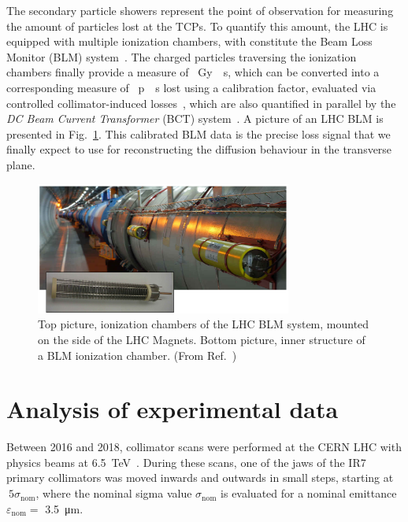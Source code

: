 The secondary particle showers represent the point of observation for measuring the amount of particles lost at the TCPs. To quantify this amount, the LHC is equipped with multiple ionization chambers, with constitute the Beam Loss Monitor (BLM) system~\cite{blmSystem1, blmSystem2}. The charged particles traversing the ionization chambers finally provide a measure of \SI{}{Gy \per s}, which can be converted into a corresponding measure of \SI{}{p \per s} lost using a calibration factor, evaluated via controlled collimator-induced losses~\cite{arek}, which are also quantified in parallel by the \textit{DC Beam Current Transformer} (BCT) system~\cite{Denard:1213275}. A picture of an LHC BLM is presented in Fig.~\ref{fig:blm}. This calibrated BLM data is the precise loss signal that we finally expect to use for reconstructing the diffusion behaviour in the transverse plane.

\begin{figure}[htp]
    \centering
    \includegraphics[width=0.75\textwidth]{5_Diffusion_measurement_LHC/figs/blm.png}
    \caption{Top picture, ionization chambers of the LHC BLM system, mounted on the side of the LHC Magnets. Bottom picture, inner structure of a BLM ionization chamber. (From Ref.~\cite{blmonline})}
    \label{fig:blm}
\end{figure}


%
\section{Analysis of experimental data}
%

Between 2016 and 2018, collimator scans were performed at the CERN LHC with physics beams at \SI{6.5}{TeV}~\cite{PhysRevAccelBeams.23.044802}. During these scans, one of the jaws of the IR7 primary collimators was moved inwards and outwards in small steps, starting at $~5\sigma_\text{nom}$, where the nominal sigma value $\sigma_\text{nom}$ is evaluated for a nominal emittance $\varepsilon_\text{nom} =$ \SI{3.5}{\micro\meter}.

